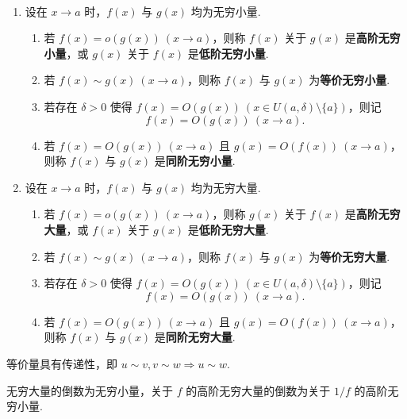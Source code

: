 \documentclass[../main.tex]{subfiles}
\begin{document}
\begin{definition} %
    \ 
    \begin{enumerate}[label = (\arabic*)]
        \item 设在 $x \to a$ 时，$f(x)$ 与 $g(x)$ 均为无穷小量. 
        \begin{enumerate}[label = \roman*.]
            \item 若 $f(x) = o(g(x)) \ (x \to a)$，则称 $f(x)$ 关于 $g(x)$ 是\textbf{高阶无穷小量}，或 $g(x)$ 关于 $f(x)$ 是\textbf{低阶无穷小量}. 

            \item 若 $f(x) \sim g(x) \ (x \to a)$，则称 $f(x)$ 与 $g(x)$ 为\textbf{等价无穷小量}. 

            \item 若存在 $\delta > 0$ 使得 $f(x) = O(g(x)) \ (x \in U(a, \delta) \setminus \{a\})$，则记 
            $$
            f(x) = O(g(x)) \ (x \to a). 
            $$

            \item 若 $f(x) = O(g(x)) \ (x \to a)$ 且 $g(x) = O(f(x)) \ (x \to a)$，则称 $f(x)$ 与 $g(x)$ 是\textbf{同阶无穷小量}. 
        \end{enumerate}

        \item 设在 $x \to a$ 时，$f(x)$ 与 $g(x)$ 均为无穷大量. 
        \begin{enumerate}[label = \roman*.]
            \item 若 $f(x) = o(g(x)) \ (x \to a)$，则称 $g(x)$ 关于 $f(x)$ 是\textbf{高阶无穷大量}，或 $f(x)$ 关于 $g(x)$ 是\textbf{低阶无穷大量}. 

            \item 若 $f(x) \sim g(x) \ (x \to a)$，则称 $f(x)$ 与 $g(x)$ 为\textbf{等价无穷大量}. 

            \item 若存在 $\delta > 0$ 使得 $f(x) = O(g(x)) \ (x \in U(a, \delta) \setminus \{a\})$，则记 
            $$
            f(x) = O(g(x)) \ (x \to a). 
            $$

            \item 若 $f(x) = O(g(x)) \ (x \to a)$ 且 $g(x) = O(f(x)) \ (x \to a)$，则称 $f(x)$ 与 $g(x)$ 是\textbf{同阶无穷大量}. 
        \end{enumerate}
    \end{enumerate}
\end{definition}

\begin{remark}
    等价量具有传递性，即 $u \sim v, v \sim w \Rightarrow u \sim w$. 

    无穷大量的倒数为无穷小量，关于 $f$ 的高阶无穷大量的倒数为关于 $1 / f$ 的高阶无穷小量. 
\end{remark}
\end{document}
